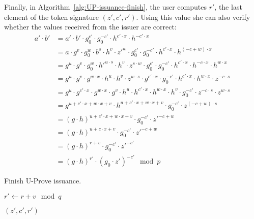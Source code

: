 Finally, in Algorithm~\ref{alg:UP-issuance-finish}, the user computes $r'$, the
last element of the token signature $(z', c', r')$. Using this value she can
also verify whether the values received from the issuer are correct:
\begin{align*}
  a' \cdot b'
  & = a' \cdot b' \cdot g_0^{c'} \cdot g_0^{-c'} \cdot h^{c' \cdot x} \cdot h^{-c' \cdot x} \\
  & = a \cdot g^v \cdot g_0^w \cdot b^s \cdot h^v \cdot z'^w
    \cdot g_0^{c'} \cdot g_0^{-c'} \cdot h^{c' \cdot x} \cdot h^{(-c + w) \cdot x} \\
  & = g^u \cdot g^v \cdot g_0^w \cdot h'^{u \cdot s} \cdot h^v \cdot z^{s \cdot w}
    \cdot g_0^{c'} \cdot g_0^{-c'} \cdot h^{c' \cdot x} \cdot h^{-c \cdot x} \cdot h^{w \cdot x} \\
  & = g^u \cdot g^v \cdot g^{w \cdot x} \cdot h^u \cdot h^v \cdot z^{w \cdot s}
    \cdot g^{c' \cdot x} \cdot g_0^{-c'}  \cdot h^{c' \cdot x} \cdot h^{w \cdot x} \cdot z^{-c \cdot s} \\
  & = g^u \cdot g^{c' \cdot x} \cdot g^{w \cdot x} \cdot g^v \cdot h^u
    \cdot h^{c' \cdot x} \cdot h^{w \cdot x} \cdot h^v \cdot g_0^{-c'} \cdot z^{-c \cdot s} \cdot z^{w \cdot s} \\
  & = g^{u + c' \cdot x + w \cdot x + v} \cdot h^{u + c' \cdot x + w \cdot x + v}
    \cdot g_0^{-c'} \cdot z^{(-c + w) \cdot s} \\
  & = (g \cdot h)^{u + c' \cdot x + w \cdot x + v} \cdot g_0^{-c'} \cdot z'^{-c + w} \\
  & = (g \cdot h)^{u + c \cdot x + v} \cdot g_0^{-c'} \cdot z'^{-c + w} \\
  & = (g \cdot h)^{r + v} \cdot g_0^{-c'} \cdot z'^{-c'} \\
  & = (g \cdot h)^{r'} \cdot (g_0 \cdot z')^{-c'} \mod p
\end{align*}

\begin{algorithm}
  \caption{Finish U-Prove issuance.}
  \label{alg:UP-issuance-finish}
  \addtolength{\baselineskip}{1mm}
  \begin{algorithmic}[1]
      \State $r' \gets r + v \mod q$

        \Return {}
      \EndIf

      \Return $(z', c', r')$
    \EndFunction
  \end{algorithmic}
\end{algorithm}

